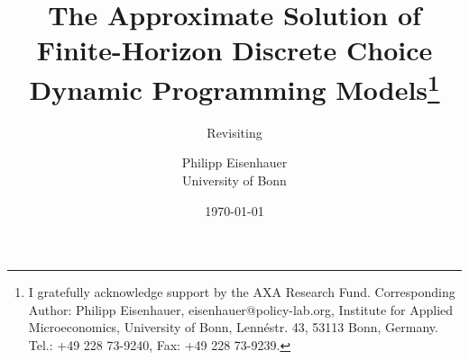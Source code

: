 \title{The Approximate Solution of Finite-Horizon Discrete Choice Dynamic Programming Models\thanks{I gratefully acknowledge support by the AXA Research Fund. Corresponding Author: Philipp Eisenhauer, eisenhauer@policy-lab.org, Institute for Applied Microeconomics, University of Bonn, Lenn\'{e}str. 43, 53113 Bonn, Germany. Tel.: +49 228 73-9240, Fax: +49 228 73-9239.}}
\subtitle{Revisiting  \citet{Keane.1994}}

\author{Philipp Eisenhauer\\
University of Bonn}
\date{\today}
